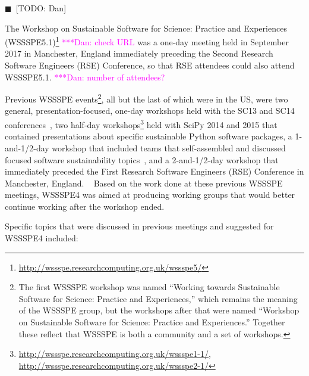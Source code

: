 \documentclass[11pt, oneside]{amsart}
\newcommand{\todo}[1]{{\color{blue}$\blacksquare$~\textsf{[TODO: #1]}}}
\newcommand{\katznote}[1]{ {\textcolor{magenta}    { ***Dan:      #1 }}}
\begin{document}
\todo{Dan}

The Workshop on Sustainable Software for Science: Practice and Experiences
(WSSSPE5.1)\footnote{\url{http://wssspe.researchcomputing.org.uk/wssspe5/}} \katznote{check URL} was a one-day meeting held in September 2017 in Manchester, England immediately preceding the
Second Research Software Engineers (RSE) Conference, so that RSE attendees could also attend WSSSPE5.1.  \katznote{number of attendees?}

Previous WSSSPE events\footnote{The first WSSSPE workshop was named
``Working towards
Sustainable Software for Science: Practice and Experiences,'' which remains the meaning
of the WSSSPE group, but the workshops after that were named
``Workshop on Sustainable
Software for Science: Practice and Experiences.'' Together these reflect
that WSSSPE is both a community and a set of workshops.}, all but the last of which were in the US, were two general, presentation-focused, one-day workshops held with the SC13 and SC14 conferences~\cite{WSSSPE1-pre-report,WSSSPE1, WSSSPE2-pre-report,WSSSPE2},
two half-day workshops\footnote{\url{http://wssspe.researchcomputing.org.uk/wssspe1-1/}, \url{http://wssspe.researchcomputing.org.uk/wssspe2-1/}} held with SciPy 2014 and 2015 that contained presentations about specific sustainable Python software packages, a 1-and-1/2-day workshop that included teams that self-assembled and discussed focused software sustainability topics~\cite{WSSSPE3}, and a 2-and-1/2-day workshop that immediately preceded the
First Research Software Engineers (RSE) Conference in Manchester, England.
~\cite{WSSSPE4}
%
Based on the work done at these previous WSSSPE meetings, WSSSPE4 was aimed
at producing working groups that would better continue working after the workshop ended.

Specific topics that were discussed in previous meetings and suggested for WSSSPE4 included:
\end{document}
